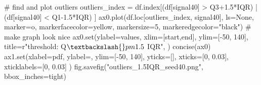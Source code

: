 \documentclass[
  letterpaper,
  DIV=11,
  numbers=noendperiod,
  oneside]{scrreprt}
\newenvironment{Shaded}{\begin{snugshade}}{\end{snugshade}}
\newcommand{\BuiltInTok}[1]{\textcolor[rgb]{0.00,0.23,0.31}{#1}}
\newcommand{\CommentTok}[1]{\textcolor[rgb]{0.37,0.37,0.37}{#1}}
\newcommand{\DecValTok}[1]{\textcolor[rgb]{0.68,0.00,0.00}{#1}}
\newcommand{\FloatTok}[1]{\textcolor[rgb]{0.68,0.00,0.00}{#1}}
\newcommand{\NormalTok}[1]{\textcolor[rgb]{0.00,0.23,0.31}{#1}}
\newcommand{\OperatorTok}[1]{\textcolor[rgb]{0.37,0.37,0.37}{#1}}
\newcommand{\StringTok}[1]{\textcolor[rgb]{0.13,0.47,0.30}{#1}}
\newcommand{\VerbatimStringTok}[1]{\textcolor[rgb]{0.13,0.47,0.30}{#1}}
\begin{document}
\begin{Shaded}
\begin{Highlighting}[]
\CommentTok{\# find and plot outliers}
\NormalTok{outliers\_index }\OperatorTok{=}\NormalTok{ df.index[(df[}\StringTok{\textquotesingle{}signal40\textquotesingle{}}\NormalTok{] }\OperatorTok{\textgreater{}}\NormalTok{ Q3}\OperatorTok{+}\FloatTok{1.5}\OperatorTok{*}\NormalTok{IQR) }\OperatorTok{|} 
\NormalTok{                          (df[}\StringTok{\textquotesingle{}signal40\textquotesingle{}}\NormalTok{] }\OperatorTok{\textless{}}\NormalTok{ Q1}\OperatorTok{{-}}\FloatTok{1.5}\OperatorTok{*}\NormalTok{IQR)}
\NormalTok{                         ]}
\NormalTok{ax0.plot(df.loc[outliers\_index, }\StringTok{\textquotesingle{}signal40\textquotesingle{}}\NormalTok{], ls}\OperatorTok{=}\StringTok{\textquotesingle{}None\textquotesingle{}}\NormalTok{,}
\NormalTok{        marker}\OperatorTok{=}\StringTok{\textquotesingle{}o\textquotesingle{}}\NormalTok{, markerfacecolor}\OperatorTok{=}\StringTok{\textquotesingle{}yellow\textquotesingle{}}\NormalTok{, markersize}\OperatorTok{=}\DecValTok{5}\NormalTok{,}
\NormalTok{        markeredgecolor}\OperatorTok{=}\StringTok{"black"}\NormalTok{)}
\CommentTok{\# make graph look nice}
\NormalTok{ax0.}\BuiltInTok{set}\NormalTok{(ylabel}\OperatorTok{=}\StringTok{\textquotesingle{}values\textquotesingle{}}\NormalTok{,}
\NormalTok{       xlim}\OperatorTok{=}\NormalTok{[start,end],}
\NormalTok{       ylim}\OperatorTok{=}\NormalTok{[}\OperatorTok{{-}}\DecValTok{50}\NormalTok{, }\DecValTok{140}\NormalTok{],}
\NormalTok{       title}\OperatorTok{=}\VerbatimStringTok{r"threshold: Q$\textbackslash{}pm1.5$ IQR"}\NormalTok{,}
\NormalTok{       )}
\NormalTok{concise(ax0)}
\NormalTok{ax1.}\BuiltInTok{set}\NormalTok{(xlabel}\OperatorTok{=}\StringTok{\textquotesingle{}pdf\textquotesingle{}}\NormalTok{,}
\NormalTok{        ylabel}\OperatorTok{=}\StringTok{\textquotesingle{}\textquotesingle{}}\NormalTok{,}
\NormalTok{        ylim}\OperatorTok{=}\NormalTok{[}\OperatorTok{{-}}\DecValTok{50}\NormalTok{, }\DecValTok{140}\NormalTok{],}
\NormalTok{        yticks}\OperatorTok{=}\NormalTok{[],}
\NormalTok{        xticks}\OperatorTok{=}\NormalTok{[}\DecValTok{0}\NormalTok{, }\FloatTok{0.03}\NormalTok{],}
\NormalTok{        xticklabels}\OperatorTok{=}\NormalTok{[}\StringTok{\textquotesingle{}0\textquotesingle{}}\NormalTok{, }\StringTok{\textquotesingle{}0.03\textquotesingle{}}\NormalTok{]}
\NormalTok{        )}
\NormalTok{fig.savefig(}\StringTok{"outliers\_1.5IQR\_seed40.png"}\NormalTok{, bbox\_inches}\OperatorTok{=}\StringTok{\textquotesingle{}tight\textquotesingle{}}\NormalTok{)}
\end{Highlighting}
\end{Shaded}
\end{document}
